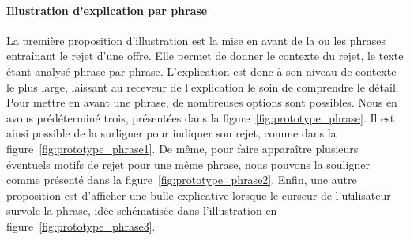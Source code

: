 \paragraph{Illustration d'explication par phrase}
La première proposition d'illustration est la mise en avant de la ou les phrases entraînant le rejet d'une offre.
Elle permet de donner le contexte du rejet, le texte étant analysé phrase par phrase. L'explication est donc à son niveau de contexte le plus large, laissant au receveur de l'explication le soin de comprendre le détail.
Pour mettre en avant une phrase, de nombreuses options sont possibles. Nous en avons prédéterminé trois, présentées dans la figure~\ref{fig:prototype_phrase}.
Il est ainsi possible de la surligner pour indiquer son rejet, comme dans la figure~\ref{fig:prototype_phrase1}.
De même, pour faire apparaître plusieurs éventuels motifs de rejet pour une même phrase, nous pouvons la souligner comme présenté dans la figure~\ref{fig:prototype_phrase2}.
Enfin, une autre proposition est d'afficher une bulle explicative lorsque le curseur de l'utilisateur survole la phrase, idée schématisée dans l'illustration en figure~\ref{fig:prototype_phrase3}.

